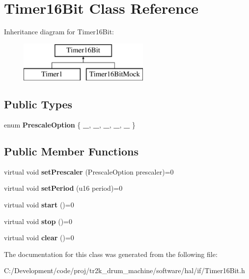 \hypertarget{class_timer16_bit}{}\section{Timer16\+Bit Class Reference}
\label{class_timer16_bit}
Inheritance diagram for Timer16\+Bit\+:\begin{figure}[H]
\begin{center}
\leavevmode
\includegraphics[height=2.000000cm]{class_timer16_bit}
\end{center}
\end{figure}
\subsection*{Public Types}
\begin{DoxyCompactItemize}
\item 
\mbox{\label{class_timer16_bit_ae77570668c50b86c26be7d095490ddb4}} 
enum {\bfseries Prescale\+Option} \{ \newline
{\bfseries \+\_}, 
{\bfseries \+\_}, 
{\bfseries \+\_}, 
{\bfseries \+\_}, 
\newline
{\bfseries \+\_}
 \}
\end{DoxyCompactItemize}
\subsection*{Public Member Functions}
\begin{DoxyCompactItemize}
\item 
\mbox{\label{class_timer16_bit_aee78b64b4e1ebd3a0ac5e671f13715c6}} 
virtual void {\bfseries set\+Prescaler} (Prescale\+Option prescaler)=0
\item 
\mbox{\label{class_timer16_bit_a7e1d467fc113a127dd77e2df135e872f}} 
virtual void {\bfseries set\+Period} (u16 period)=0
\item 
\mbox{\label{class_timer16_bit_a7b26f468974c9da8d96c43f920bda96e}} 
virtual void {\bfseries start} ()=0
\item 
\mbox{\label{class_timer16_bit_abc261659bd9a3b0499e56352dbc37bc3}} 
virtual void {\bfseries stop} ()=0
\item 
\mbox{\label{class_timer16_bit_a24ab7f6d22dd9af3ad60c7b3472a62a0}} 
virtual void {\bfseries clear} ()=0
\end{DoxyCompactItemize}


The documentation for this class was generated from the following file\+:\begin{DoxyCompactItemize}
\item 
C\+:/\+Development/code/proj/tr2k\+\_\+drum\+\_\+machine/software/hal/if/Timer16\+Bit.\+h\end{DoxyCompactItemize}
